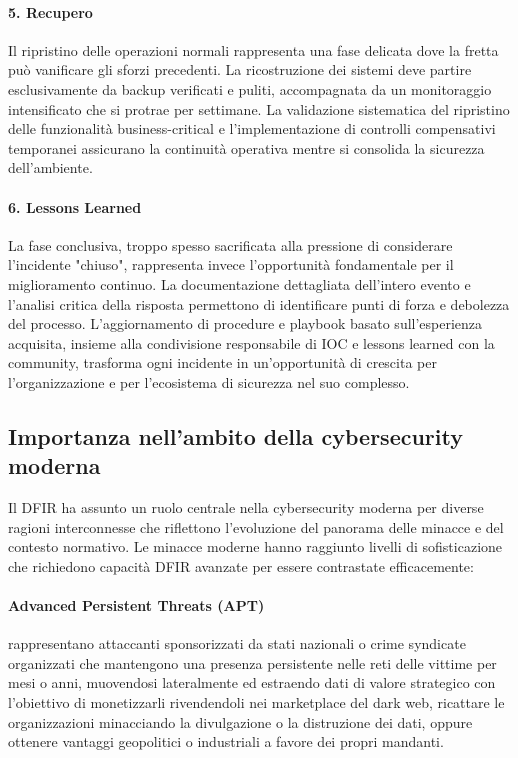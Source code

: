 \paragraph{5. Recupero}
Il ripristino delle operazioni normali rappresenta una fase delicata dove la fretta può vanificare gli sforzi precedenti. La ricostruzione dei sistemi deve partire esclusivamente da backup verificati e puliti, accompagnata da un monitoraggio intensificato che si protrae per settimane. La validazione sistematica del ripristino delle funzionalità business-critical e l'implementazione di controlli compensativi temporanei assicurano la continuità operativa mentre si consolida la sicurezza dell'ambiente.

\paragraph{6. Lessons Learned}
La fase conclusiva, troppo spesso sacrificata alla pressione di considerare l'incidente "chiuso", rappresenta invece l'opportunità fondamentale per il miglioramento continuo. La documentazione dettagliata dell'intero evento e l'analisi critica della risposta permettono di identificare punti di forza e debolezza del processo. L'aggiornamento di procedure e playbook basato sull'esperienza acquisita, insieme alla condivisione responsabile di IOC e lessons learned con la community, trasforma ogni incidente in un'opportunità di crescita per l'organizzazione e per l'ecosistema di sicurezza nel suo complesso.

\subsection{Importanza nell'ambito della cybersecurity moderna}

Il DFIR ha assunto un ruolo centrale nella cybersecurity moderna per diverse ragioni interconnesse che riflettono l'evoluzione del panorama delle minacce e del contesto normativo. Le minacce moderne hanno raggiunto livelli di sofisticazione che richiedono capacità DFIR avanzate per essere contrastate efficacemente:

\paragraph{Advanced Persistent Threats (APT)} rappresentano attaccanti sponsorizzati da stati nazionali o crime syndicate organizzati che mantengono una presenza persistente nelle reti delle vittime per mesi o anni, muovendosi lateralmente ed estraendo dati di valore strategico con l'obiettivo di monetizzarli rivendendoli nei marketplace del dark web, ricattare le organizzazioni minacciando la divulgazione o la distruzione dei dati, oppure ottenere vantaggi geopolitici o industriali a favore dei propri mandanti.

